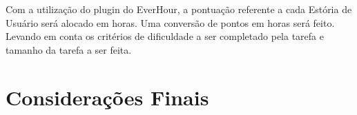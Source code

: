 	Com a utilização do plugin do EverHour, a pontuação referente a cada Estória de Usuário será alocado em horas. Uma conversão de pontos em horas será feito. Levando em conta os critérios de dificuldade a ser completado pela tarefa e tamanho da tarefa a ser feita. 


\section{Considerações Finais}